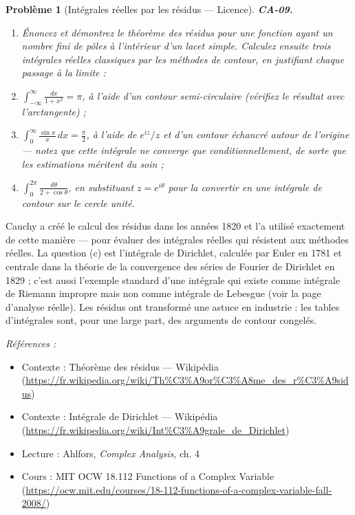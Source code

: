 \documentclass[11pt]{article}
\newtheorem{problem}{Problème}
\newenvironment{refs}{\par\small\noindent\emph{Références :}\begin{itemize}\setlength\itemsep{0pt}}{\end{itemize}\normalsize}
\begin{document}
\begin{problem}[{Intégrales réelles par les résidus --- Licence}]
\textbf{CA-09.} \begin{enumerate}
\item[(a)] Énoncez et démontrez le théorème des résidus pour une fonction
ayant un nombre fini de pôles à l'intérieur d'un lacet simple. Calculez ensuite trois intégrales
réelles classiques par les méthodes de contour, en justifiant chaque passage à la limite :
\item[(b)] $ \int_{-\infty}^{\infty} \frac{dx}{1 + x^2} = \pi $, à l'aide d'un contour semi-circulaire
(vérifiez le résultat avec l'arctangente) ;
\item[(c)] $ \int_0^\infty \frac{\sin x}{x}\,dx = \frac{\pi}{2} $, à l'aide de $ e^{iz}/z $ et d'un
contour échancré autour de l'origine --- notez que cette intégrale ne converge que
conditionnellement, de sorte que les estimations méritent du soin ;
\item[(d)] $ \int_0^{2\pi} \frac{d\theta}{2 + \cos\theta} $, en substituant
$ z = e^{i\theta} $ pour la convertir en une intégrale de contour sur le cercle unité.
\end{enumerate}

\end{problem}

\noindent Cauchy a créé le calcul des résidus dans les années 1820 et l'a utilisé
exactement de cette manière --- pour évaluer des intégrales réelles qui résistent aux méthodes
réelles. La question (c) est l'intégrale de Dirichlet, calculée par Euler en 1781 et centrale dans
la théorie de la convergence des séries de Fourier de Dirichlet en 1829 ; c'est aussi l'exemple
standard d'une intégrale qui existe comme intégrale de Riemann impropre mais non comme intégrale de
Lebesgue (voir la page d'analyse réelle). Les résidus ont transformé une astuce en industrie : les
tables d'intégrales sont, pour une large part, des arguments de contour congelés.

\begin{refs}
\item Contexte : Théorème des résidus --- Wikipédia (\url{https://fr.wikipedia.org/wiki/Th%C3%A9or%C3%A8me_des_r%C3%A9sidus})
\item Contexte : Intégrale de Dirichlet --- Wikipédia (\url{https://fr.wikipedia.org/wiki/Int%C3%A9grale_de_Dirichlet})
\item Lecture : Ahlfors, \textit{Complex Analysis}, ch. 4
\item Cours : MIT OCW 18.112 Functions of a Complex Variable (\url{https://ocw.mit.edu/courses/18-112-functions-of-a-complex-variable-fall-2008/})
\end{refs}
\end{document}
